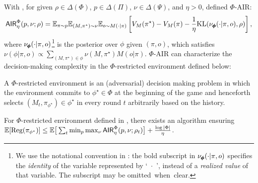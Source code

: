 With , for given $\rho\in\Delta(\Phi)$, $p\in\Delta(\Pi)$, $\nu\in\Delta(\Psi)$, and $\eta>0$, \cite{liu2025decision} defined $\Phi$-AIR:
\begin{align}
    \mathsf{AIR}^{\Phi}_{\eta}(p,\nu; \rho) = \mathbb{E}_{\pi\sim p} \mathbb{E}_{(M,\pi^\star)\sim \nu} \mathbb{E}_{o\sim M(\cdot|\pi)}\left[V_M(\pi^\star) - V_M(\pi) - \frac{1}{\eta} \text{KL}(\nu_{\pmb{\phi}}(\cdot|\pi, o), \rho)\right],  \label{eq:phiair}
\end{align}
where $\nu_{\pmb{\phi}}(\cdot|\pi,o)$\footnote{We use the notational convention in \cite{liu2025decision}: the bold subscript in $\nu_{\pmb{\phi}}(\cdot|\pi,o)$ specifies the \emph{identity} of the variable represented by `~$\cdot$~', instead of a \emph{realized value} of that variable. The subscript may be omitted~when~clear.} is the posterior over $\phi$ given $(\pi, o)$, which satisfies $\nu(\phi|\pi,o)\propto \sum_{(M,\pi^\star)\in \phi} \nu(M,\pi^\star) M(o|\pi)$. 
$\Phi$-AIR can characterize the decision-making complexity in the $\Phi$-restricted environment defined below: 
\begin{definition}\label{def: restricted env} A $\Phi$-restricted environment is an (adversarial) decision making problem in which the environment commits to $\phi^\star\in\Phi$ at the beginning of the game and henceforth selects $(M_t,\pi_{\phi^\star})\in \phi^\star$ in every round $t$ arbitrarily based on the history. 
\end{definition}


\begin{theorem}\label{thm: air phi} For $\Phi$-restricted environment defined in , there exists an algorithm ensuring $\mathbb{E}[\text{\rm Reg}(\pi_{\phi^\star})]\leq  \mathbb{E}\big[\sum_{t}\min_p \max_\nu \mathsf{AIR}_\eta^\Phi(p,\nu;\rho_t)\big] + \frac{\log|\Phi|}{\eta}$. 
\end{theorem}


